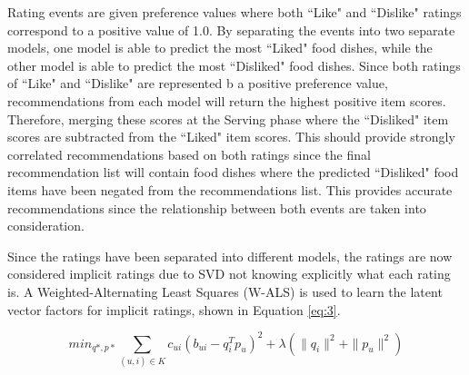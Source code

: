 Rating events are given preference values where both ``Like" and ``Dislike" ratings correspond to a positive value of 1.0. By separating the events into two separate models, one model is able to predict the most ``Liked" food dishes, while the other model is able to predict the most ``Disliked" food dishes. Since both ratings of ``Like" and ``Dislike" are represented b a positive preference value, recommendations from each model will return the highest positive item scores. Therefore, merging these scores at the Serving phase where the ``Disliked" item scores are subtracted from the ``Liked" item scores. This should provide strongly correlated recommendations based on both ratings since the final recommendation list will contain food dishes where the predicted ``Disliked" food items have been negated from the recommendations list. This provides accurate recommendations since the relationship between both events are taken into consideration.

Since the ratings have been separated into different models, the ratings are now considered implicit ratings due to SVD not knowing explicitly what each rating is. A Weighted-Alternating Least Squares (W-ALS) \cite{implicit, abergerrecommender} is used to learn the latent vector factors for implicit ratings, shown in Equation \ref{eq:3}. 


\begin{equation}\label{eq:3}
\displaystyle min_{q*,p*} \sum_{ (u,i) \in K} c_{ui}(b_{ui} - q_{i}^T p_{u})^2 + \lambda (\| q_{i} \|^2 + \| p_{u} \|^2 )
\end{equation}

